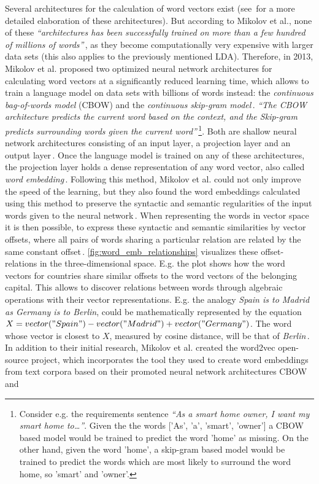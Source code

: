 Several architectures for the calculation of word vectors exist (see\,\cite{mikolov_efficient_2013,mikolov_linguistic_2013} for a more detailed elaboration of these architectures). But according to Mikolov et al., none of these \textit{``architectures has been successfully trained on more than a few hundred of millions of words''}\,\cite[p1]{mikolov_efficient_2013}, as they become computationally very expensive with larger data sets (this also applies to the previously mentioned LDA). Therefore, in 2013, Mikolov et al. proposed two optimized neural network architectures for calculating word vectors at a significantly reduced learning time, which allows to train a language model on data sets with billions of words instead: the \emph{continuous bag-of-words model} (CBOW) and the \emph{continuous skip-gram model}\,\cite{mikolov_efficient_2013}.
\textit{``The CBOW architecture predicts the current word based on the context, and the Skip-gram predicts surrounding words given the current word''}\,\cite{mikolov_efficient_2013}\footnote{Consider e.g. the requirements sentence \textit{``As a smart home owner, I want my smart home to\dots''}. Given the the words ['As', 'a', 'smart', 'owner'] a CBOW based model would be trained to predict the word 'home' as missing. On the other hand, given the word 'home', a skip-gram based model would be trained to predict the words which are most likely to surround the word home, so 'smart' and 'owner'.}. Both are shallow neural network architectures consisting of an input layer, a projection layer and an output layer\,\cite{mikolov_efficient_2013,qiang_topic_2016}. Once the language model is trained on any of these architectures, the projection layer holds a dense representation of any word vector, also called \textit{word embedding}\,\cite{tensorflow_word_embeddings}. Following this method, Mikolov et al. could not only improve the speed of the learning, but they also found the word embeddings calculated using this method to preserve the syntactic and semantic regularities of the input words given to the neural network\,\cite{mikolov_linguistic_2013}. When representing the words in vector space it is then possible, to express these syntactic and semantic similarities by vector offsets, where all pairs of words sharing a particular relation are related by the same constant offset\,\cite{mikolov_linguistic_2013}. \autoref{fig:word_emb_relationships} visualizes these offset-relations in the three-dimensional space. E.g. the  plot shows how the word vectors for countries share similar offsets to the word vectors of the belonging capital. This allows to discover relations between words through algebraic operations with their vector representations. E.g. the analogy \textit{Spain is to Madrid as Germany is to Berlin}, could be mathematically represented by the equation $X = vector("Spain") - vector("Madrid") + vector("Germany")$. The word whose vector is closest to $X$, measured by cosine distance, will be that of \textit{Berlin}\,\cite{mikolov_efficient_2013}. In addition to their initial research, Mikolov et al. created the word2vec open-source project, which incorporates the tool they used to create word embeddings from text corpora based on their promoted neural network architectures CBOW and 